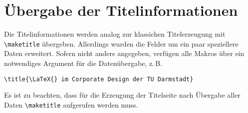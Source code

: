 \documentclass[
	ngerman,
	ruledheaders=section,%
	class=report,%
	thesis={type=bachelor},%
	accentcolor=9c,%
	custommargins=true,%
	marginpar=false,%
	parskip=half-,%
	fontsize=11pt,%
]{tudapub}
\begin{document}
\section{Übergabe der Titelinformationen}

Die Titelinformationen werden analog zur klassichen Titelerzeugung mit \verb+\maketitle+ übergeben. Allerdings wurden die Felder um ein paar speziellere Daten erweitert. Sofern nicht anders angegeben, verfügen alle Makros über ein notwendiges Argument für die Datenübergabe, z.\,B.
\begin{verbatim}
\title{\LaTeX{} im Corporate Design der TU Darmstadt}
\end{verbatim}
Es ist zu beachten, dass für die Erzeugung der Titelseite nach Übergabe aller Daten \verb+\maketitle+ aufgerufen werden muss.
\end{document}
